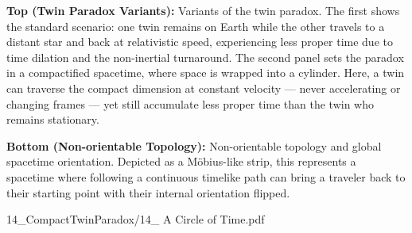 \begin{SideNotePage}{
  \textbf{Top (Twin Paradox Variants):} Variants of the twin paradox. The first shows the standard scenario: one twin remains on Earth while the other travels to a distant star and back at relativistic speed, experiencing less proper time due to time dilation and the non-inertial turnaround. The second panel sets the paradox in a compactified spacetime, where space is wrapped into a cylinder. Here, a twin can traverse the compact dimension at constant velocity — never accelerating or changing frames — yet still accumulate less proper time than the twin who remains stationary. \par
  \textbf{Bottom (Non-orientable Topology):} Non-orientable topology and global spacetime orientation. Depicted as a Möbius-like strip, this represents a spacetime where following a continuous timelike path can bring a traveler back to their starting point with their internal orientation flipped.
}{14_CompactTwinParadox/14_ A Circle of Time.pdf}
\end{SideNotePage}
